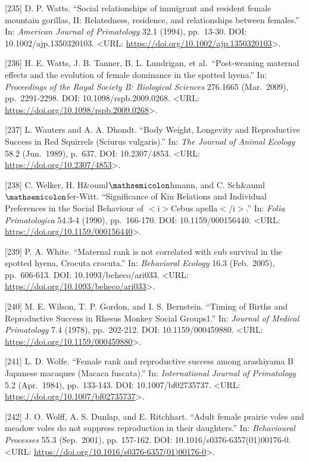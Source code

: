 \documentclass[
]{article}
\begin{document}
{[}235{]} D. P. Watts. ``Social relationships of immigrant and resident
female mountain gorillas, II: Relatedness, residence, and relationships
between females.'' In: \emph{American Journal of Primatology} 32.1
(1994), pp.~13-30. DOI: 10.1002/ajp.1350320103. \textless URL:
\url{https://doi.org/10.1002/ajp.1350320103}\textgreater.

{[}236{]} H. E. Watts, J. B. Tanner, B. L. Lundrigan, et
al.~``Post-weaning maternal effects and the evolution of female
dominance in the spotted hyena.'' In: \emph{Proceedings of the Royal
Society B: Biological Sciences} 276.1665 (Mar.~2009), pp.~2291-2298.
DOI: 10.1098/rspb.2009.0268. \textless URL:
\url{https://doi.org/10.1098/rspb.2009.0268}\textgreater.

{[}237{]} L. Wauters and A. A. Dhondt. ``Body Weight, Longevity and
Reproductive Success in Red Squirrels (Sciurus vulgaris).'' In:
\emph{The Journal of Animal Ecology} 58.2 (Jun.~1989), p.~637. DOI:
10.2307/4853. \textless URL:
\url{https://doi.org/10.2307/4853}\textgreater.

{[}238{]} C. Welker, H. H\&ouml\(\mathsemicolon\)hmann, and C.
Sch\&auml\(\mathsemicolon\)fer-Witt. ``Significance of Kin Relations and
Individual Preferences in the Social Behaviour of
\(\less\)i\(\greater\)Cebus apella\(\less\)/i\(\greater\).'' In:
\emph{Folia Primatologica} 54.3-4 (1990), pp.~166-170. DOI:
10.1159/000156440. \textless URL:
\url{https://doi.org/10.1159/000156440}\textgreater.

{[}239{]} P. A. White. ``Maternal rank is not correlated with cub
survival in the spotted hyena, Crocuta crocuta.'' In: \emph{Behavioral
Ecology} 16.3 (Feb.~2005), pp.~606-613. DOI: 10.1093/beheco/ari033.
\textless URL: \url{https://doi.org/10.1093/beheco/ari033}\textgreater.

{[}240{]} M. E. Wilson, T. P. Gordon, and I. S. Bernstein. ``Timing of
Births and Reproductive Success in Rhesus Monkey Social Groups1.'' In:
\emph{Journal of Medical Primatology} 7.4 (1978), pp.~202-212. DOI:
10.1159/000459880. \textless URL:
\url{https://doi.org/10.1159/000459880}\textgreater.

{[}241{]} L. D. Wolfe. ``Female rank and reproductive success among
arashiyama B Japanese macaques (Macaca fuscata).'' In:
\emph{International Journal of Primatology} 5.2 (Apr.~1984),
pp.~133-143. DOI: 10.1007/bf02735737. \textless URL:
\url{https://doi.org/10.1007/bf02735737}\textgreater.

{[}242{]} J. O. Wolff, A. S. Dunlap, and E. Ritchhart. ``Adult female
prairie voles and meadow voles do not suppress reproduction in their
daughters.'' In: \emph{Behavioural Processes} 55.3 (Sep.~2001), pp.
157-162. DOI: 10.1016/s0376-6357(01)00176-0. \textless URL:
\url{https://doi.org/10.1016/s0376-6357(01)00176-0}\textgreater.
\end{document}
